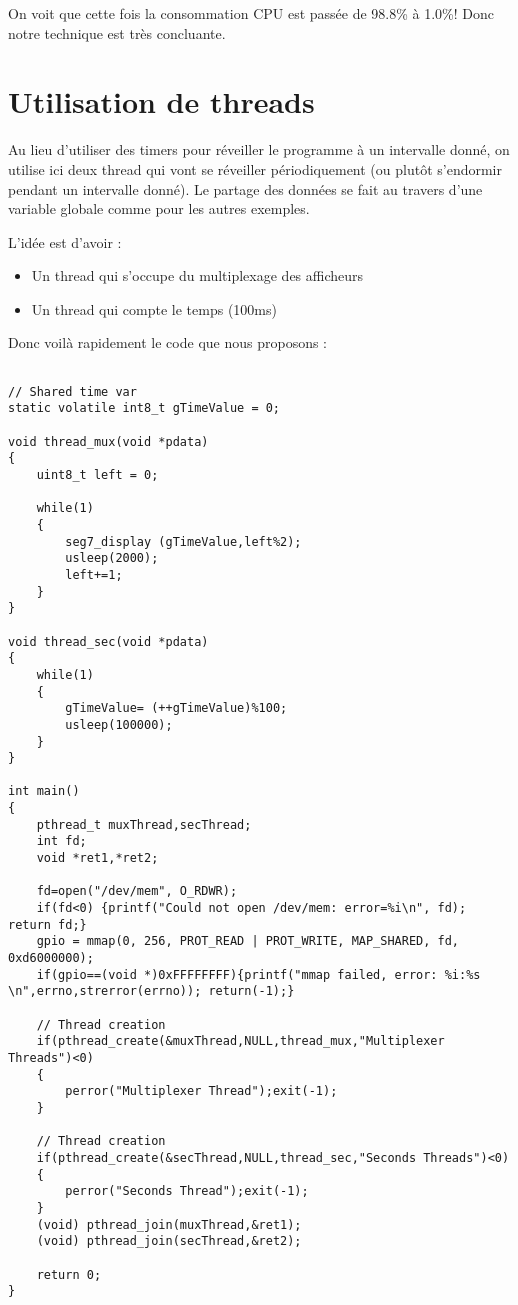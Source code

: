 On voit que cette fois la consommation CPU est passée de 98.8\% à 1.0\%! Donc notre technique est très concluante.

\newpage\section{Utilisation de threads}
Au lieu d'utiliser des timers pour réveiller le programme à un intervalle donné, on utilise ici deux thread qui vont se réveiller périodiquement (ou plutôt s'endormir pendant un intervalle donné). Le partage des données se fait au travers d'une variable globale comme pour les autres exemples. 

L'idée est d'avoir :
\begin{itemize}
\item Un thread qui s'occupe du multiplexage des afficheurs
\item Un thread qui compte le temps (100ms)\\
\end{itemize}

Donc voilà rapidement le code que nous proposons :
 
\begin{lstlisting}[frame=single,style=C]  % Start your code-block

// Shared time var
static volatile int8_t gTimeValue = 0;

void thread_mux(void *pdata)
{
	uint8_t left = 0;

	while(1)
	{
		seg7_display (gTimeValue,left%2);
		usleep(2000);
		left+=1;
	}
}

void thread_sec(void *pdata)
{
	while(1)
	{
		gTimeValue= (++gTimeValue)%100;
		usleep(100000);
	}
}	

int main()
{
	pthread_t muxThread,secThread;
	int fd;
	void *ret1,*ret2;

	fd=open("/dev/mem", O_RDWR);
	if(fd<0) {printf("Could not open /dev/mem: error=%i\n", fd); return fd;}
	gpio = mmap(0, 256, PROT_READ | PROT_WRITE, MAP_SHARED, fd, 0xd6000000);
	if(gpio==(void *)0xFFFFFFFF){printf("mmap failed, error: %i:%s \n",errno,strerror(errno)); return(-1);}
	
	// Thread creation
	if(pthread_create(&muxThread,NULL,thread_mux,"Multiplexer Threads")<0)
	{
		perror("Multiplexer Thread");exit(-1);
	}

	// Thread creation
	if(pthread_create(&secThread,NULL,thread_sec,"Seconds Threads")<0)
	{
		perror("Seconds Thread");exit(-1);
	}
	(void) pthread_join(muxThread,&ret1);
	(void) pthread_join(secThread,&ret2);

	return 0;
}
\end{lstlisting}

